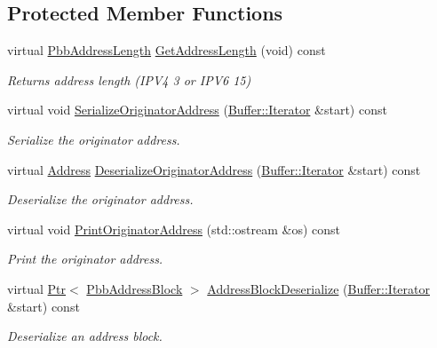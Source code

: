 \subsection*{Protected Member Functions}
\begin{DoxyCompactItemize}
\item 
virtual \hyperlink{namespacens3_a79988e6e8b09f64c6ffca894994cb033}{Pbb\+Address\+Length} \hyperlink{classns3_1_1PbbMessageIpv4_a5456c0d8d19d3be2795976e9c96be144}{Get\+Address\+Length} (void) const 
\begin{DoxyCompactList}\small\item\em Returns address length (I\+P\+V4 3 or I\+P\+V6 15) \end{DoxyCompactList}\item 
virtual void \hyperlink{classns3_1_1PbbMessageIpv4_ad316789fa841c65404568c29c4b10ac7}{Serialize\+Originator\+Address} (\hyperlink{classns3_1_1Buffer_1_1Iterator}{Buffer\+::\+Iterator} \&start) const 
\begin{DoxyCompactList}\small\item\em Serialize the originator address. \end{DoxyCompactList}\item 
virtual \hyperlink{classns3_1_1Address}{Address} \hyperlink{classns3_1_1PbbMessageIpv4_a0e87efc841a1d8cdc5e5a683dd9acab1}{Deserialize\+Originator\+Address} (\hyperlink{classns3_1_1Buffer_1_1Iterator}{Buffer\+::\+Iterator} \&start) const 
\begin{DoxyCompactList}\small\item\em Deserialize the originator address. \end{DoxyCompactList}\item 
virtual void \hyperlink{classns3_1_1PbbMessageIpv4_aa9b98a164e6ded11efe3dadd9eb56fc6}{Print\+Originator\+Address} (std\+::ostream \&os) const 
\begin{DoxyCompactList}\small\item\em Print the originator address. \end{DoxyCompactList}\item 
virtual \hyperlink{classns3_1_1Ptr}{Ptr}$<$ \hyperlink{classns3_1_1PbbAddressBlock}{Pbb\+Address\+Block} $>$ \hyperlink{classns3_1_1PbbMessageIpv4_af1207d07b64b99cba140db02aa1b9b4c}{Address\+Block\+Deserialize} (\hyperlink{classns3_1_1Buffer_1_1Iterator}{Buffer\+::\+Iterator} \&start) const 
\begin{DoxyCompactList}\small\item\em Deserialize an address block. \end{DoxyCompactList}\end{DoxyCompactItemize}
